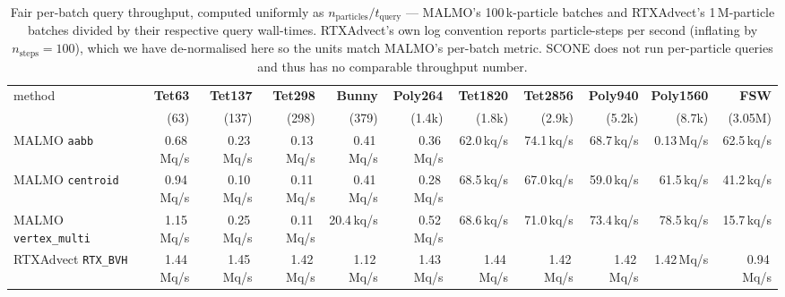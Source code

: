 \begin{table}[t]
\centering\small
\caption{Fair per-batch query throughput, computed uniformly as $n_\text{particles} / t_\text{query}$ --- MALMO's 100\,k-particle batches and RTXAdvect's 1\,M-particle batches divided by their respective query wall-times.  RTXAdvect's own log convention reports particle-steps per second (inflating by $n_\text{steps}=100$), which we have de-normalised here so the units match MALMO's per-batch metric.  SCONE does not run per-particle queries and thus has no comparable throughput number.}
\label{tab:r26-tput}
\begin{tabular}{lrrrrrrrrrr}
\toprule
method & \textbf{Tet63} & \textbf{Tet137} & \textbf{Tet298} & \textbf{Bunny} & \textbf{Poly264} & \textbf{Tet1820} & \textbf{Tet2856} & \textbf{Poly940} & \textbf{Poly1560} & \textbf{FSW} \\
 & (63) & (137) & (298) & (379) & (1.4k) & (1.8k) & (2.9k) & (5.2k) & (8.7k) & (3.05M) \\
\midrule
MALMO \texttt{aabb} & 0.68\,Mq/s & 0.23\,Mq/s & 0.13\,Mq/s & 0.41\,Mq/s & 0.36\,Mq/s & 62.0\,kq/s & 74.1\,kq/s & 68.7\,kq/s & 0.13\,Mq/s & 62.5\,kq/s \\
MALMO \texttt{centroid} & 0.94\,Mq/s & 0.10\,Mq/s & 0.11\,Mq/s & 0.41\,Mq/s & 0.28\,Mq/s & 68.5\,kq/s & 67.0\,kq/s & 59.0\,kq/s & 61.5\,kq/s & 41.2\,kq/s \\
MALMO \texttt{vertex\_multi} & 1.15\,Mq/s & 0.25\,Mq/s & 0.11\,Mq/s & 20.4\,kq/s & 0.52\,Mq/s & 68.6\,kq/s & 71.0\,kq/s & 73.4\,kq/s & 78.5\,kq/s & 15.7\,kq/s \\
\midrule
RTXAdvect \texttt{RTX\_BVH} & 1.44\,Mq/s & 1.45\,Mq/s & 1.42\,Mq/s & 1.12\,Mq/s & 1.43\,Mq/s & 1.44\,Mq/s & 1.42\,Mq/s & 1.42\,Mq/s & 1.42\,Mq/s & 0.94\,Mq/s \\
\bottomrule
\end{tabular}
\end{table}
